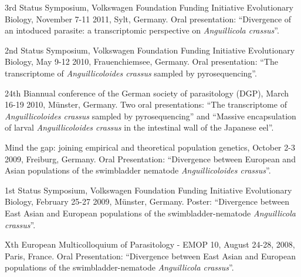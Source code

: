 \documentclass[10pt,letterpaper]{article}
\renewenvironment{itemize}{
  \begin{list}{}{
    \setlength{\leftmargin}{1.5em}
    \setlength{\itemsep}{0.25em}
    \setlength{\parskip}{0pt}
    \setlength{\parsep}{0.25em}
  }
}{
  \end{list}
}
\begin{document}
\begin{itemize}

\item 3rd Status Symposium, Volkswagen Foundation Funding Initiative
  Evolutionary Biology, November 7-11 2011, Sylt, Germany. Oral
  presentation: ``Divergence of an intoduced parasite: a
  transcriptomic perspective on \textit{Anguillicola crassus}''.

\item 2nd Status Symposium, Volkswagen Foundation Funding Initiative
  Evolutionary Biology, May 9-12 2010, Frauenchiemsee, Germany. Oral
  presentation: ``The transcriptome of \textit{Anguillicoloides
    crassus} sampled by pyrosequencing''.

\item 24th Biannual conference of the German society of parasitology
  (DGP), March 16-19 2010, M\"unster, Germany. Two oral presentations:
  ``The transcriptome of \textit{Anguillicoloides crassus} sampled by
  pyrosequencing'' and ``Massive encapsulation of larval
  \textit{Anguillicoloides crassus} in the intestinal wall of the
  Japanese eel''.

\item Mind the gap: joining empirical and theoretical population
  genetics, October 2-3 2009, Freiburg, Germany. Oral Presentation:
  ``Divergence between European and Asian populations of the
  swimbladder nematode \textit{Anguillicoloides crassus}''.

\item 1st Status Symposium, Volkswagen Foundation Funding Initiative
  Evolutionary Biology, February 25-27 2009, M\"unster,
  Germany. Poster: ``Divergence between East Asian and European
  populations of the swimbladder-nematode \textit{Anguillicola
    crassus}''.

\item Xth European Multicolloquium of Parasitology - EMOP 10, August
  24-28, 2008, Paris, France. Oral Presentation: ``Divergence between
  East Asian and European populations of the swimbladder-nematode
  \textit{Anguillicola crassus}''.

\end{itemize}


\end{document}
